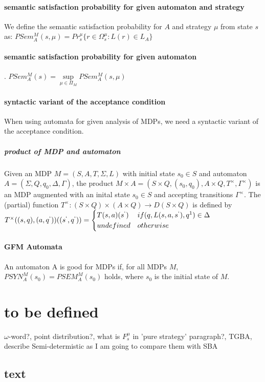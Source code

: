 \documentclass[
	digital
nolof, nolot
]{fithesis3}
\begin{document}
		\paragraph{semantic satisfaction probability for given automaton and strategy}
		We define the semantic satisfaction probability for $A$
		and strategy $\mu$ from state $s$ as:\newline
		$PSem_A^M(s,\mu)=Pr_s^\mu\{r \in\Omega_s^\mu:L(r)\in L_A  \}$
		\paragraph{semantic satisfaction probability for given automaton}
		.\newline
		$PSem_A^M(s)=\underset{\mu \in \Pi_M}{\sup} PSem_A^M(s, \mu)$
		\paragraph{syntactic variant of the acceptance condition}
		When using automata for given analysis of MDPs, we need
		a syntactic variant of the acceptance condition.
		\subparagraph{product of MDP and automaton}
		Given an MDP $M=(S,A,T,\Sigma,L)$ with initial state $s_0 \in S$
		and automaton $A = (\Sigma, Q, q_0, \Delta, \Gamma)$,
		the product $M \times A = (
		S \times Q,
		(s_0, q_0),
		A \times Q,
		T^\times,
		\Gamma^\times
		)$ is an MDP augmented with an inital state $s_0 \in S$ 
		and accepting transitions $\Gamma^\times$.
		The (partial) function
		$T^\times:
		(S \times Q) \times (A \times Q) \rightarrow D(S \times Q)$
		is defined by
		$T^\times((s,q), (a,q^`))((s^`, q^`))=
		\begin{cases}
			T(s,a)(s^`) &if (q,L(s,a,s^`),q^1) \in \Delta\\
			undefined &otherwise
		\end{cases}
		$
		\paragraph{GFM Automata}
		An automaton A is good for MDPs if, for all MDPs $M$, $PSYN_A^M(s_0) = PSEM_A^M(s_0)$ holds, where $s_0$ is the initial state of $M$.
		\section{to be defined}
		$\omega$-word?, point distribution?, what is $F_s^\mu$ in 'pure strategy' paragraph?, TGBA, describe Semi-determistic as I am going to compare them with SBA 
		\subsection{text}
		 
\end{document}

